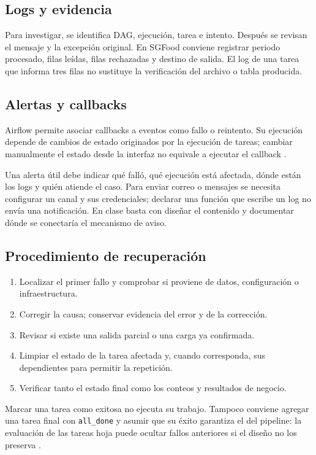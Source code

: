 \documentclass[12pt]{article}
\begin{document}
\subsection{Logs y evidencia}
Para investigar, se identifica DAG, ejecución, tarea e intento. Después se revisan el mensaje y la excepción original. En SGFood conviene registrar periodo procesado, filas leídas, filas rechazadas y destino de salida. El log de una tarea que informa tres filas no sustituye la verificación del archivo o tabla producida.

\subsection{Alertas y callbacks}
Airflow permite asociar callbacks a eventos como fallo o reintento. Su ejecución depende de cambios de estado originados por la ejecución de tareas; cambiar manualmente el estado desde la interfaz no equivale a ejecutar el callback \cite{airflow_callbacks}.

Una alerta útil debe indicar qué falló, qué ejecución está afectada, dónde están los logs y quién atiende el caso. Para enviar correo o mensajes se necesita configurar un canal y sus credenciales; declarar una función que escribe un log no envía una notificación. En clase basta con diseñar el contenido y documentar dónde se conectaría el mecanismo de aviso.

\subsection{Procedimiento de recuperación}
\begin{enumerate}[leftmargin=*]
\item Localizar el primer fallo y comprobar si proviene de datos, configuración o infraestructura.
\item Corregir la causa; conservar evidencia del error y de la corrección.
\item Revisar si existe una salida parcial o una carga ya confirmada.
\item Limpiar el estado de la tarea afectada y, cuando corresponda, sus dependientes para permitir la repetición.
\item Verificar tanto el estado final como los conteos y resultados de negocio.
\end{enumerate}
Marcar una tarea como exitosa no ejecuta su trabajo. Tampoco conviene agregar una tarea final con \texttt{all\_done} y asumir que su éxito garantiza el del pipeline: la evaluación de las tareas hoja puede ocultar fallos anteriores si el diseño no los preserva \cite{airflow_runs}.
\end{document}
